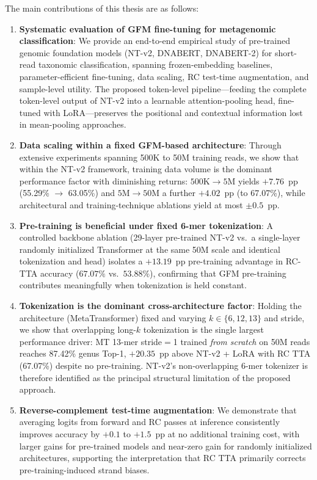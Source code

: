 The main contributions of this thesis are as follows:

\begin{enumerate}
    \item \textbf{Systematic evaluation of GFM fine-tuning for metagenomic classification}: We provide an end-to-end empirical study of pre-trained genomic foundation models (NT-v2, DNABERT, DNABERT-2) for short-read taxonomic classification, spanning frozen-embedding baselines, parameter-efficient fine-tuning, data scaling, RC test-time augmentation, and sample-level utility. The proposed token-level pipeline---feeding the complete token-level output of NT-v2 into a learnable attention-pooling head, fine-tuned with LoRA---preserves the positional and contextual information lost in mean-pooling approaches.

    \item \textbf{Data scaling within a fixed GFM-based architecture}: Through extensive experiments spanning 500K to 50M training reads, we show that within the NT-v2 framework, training data volume is the dominant performance factor with diminishing returns: $500\text{K}\to 5\text{M}$ yields $+7.76$~pp (55.29\% $\to$ 63.05\%) and $5\text{M}\to 50\text{M}$ a further $+4.02$~pp (to 67.07\%), while architectural and training-technique ablations yield at most $\pm0.5$~pp.

    \item \textbf{Pre-training is beneficial under fixed 6-mer tokenization}: A controlled backbone ablation (29-layer pre-trained NT-v2 vs.\ a single-layer randomly initialized Transformer at the same 50M scale and identical tokenization and head) isolates a $+13.19$~pp pre-training advantage in RC-TTA accuracy ($67.07\%$ vs.\ $53.88\%$), confirming that GFM pre-training contributes meaningfully when tokenization is held constant.

    \item \textbf{Tokenization is the dominant cross-architecture factor}: Holding the architecture (MetaTransformer) fixed and varying $k \in \{6, 12, 13\}$ and stride, we show that overlapping long-$k$ tokenization is the single largest performance driver: MT 13-mer stride$=$1 trained \emph{from scratch} on 50M reads reaches 87.42\% genus Top-1, $+20.35$~pp above NT-v2 + LoRA with RC TTA (67.07\%) despite no pre-training. NT-v2's non-overlapping 6-mer tokenizer is therefore identified as the principal structural limitation of the proposed approach.

    \item \textbf{Reverse-complement test-time augmentation}: We demonstrate that averaging logits from forward and RC passes at inference consistently improves accuracy by $+0.1$ to $+1.5$~pp at no additional training cost, with larger gains for pre-trained models and near-zero gain for randomly initialized architectures, supporting the interpretation that RC TTA primarily corrects pre-training-induced strand biases.


\end{enumerate}
